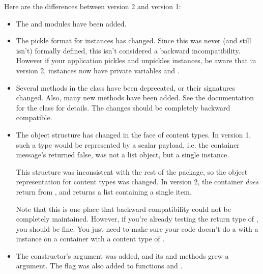 Here are the differences between  version 2 and version 1:

\begin{itemize}
\item The  and  modules
      have been added.

\item The pickle format for  instances has changed.
      Since this was never (and still isn't) formally defined, this
      isn't considered a backward incompatibility.  However if your
      application pickles and unpickles  instances, be
      aware that in  version 2, 
      instances now have private variables  and
      .

\item Several methods in the  class have been
      deprecated, or their signatures changed.  Also, many new methods
      have been added.  See the documentation for the 
      class for details.  The changes should be completely backward
      compatible.

\item The object structure has changed in the face of
       content types.  In 
      version 1, such a type would be represented by a scalar payload,
      i.e. the container message's  returned
      false,  was not a list object, but a single
       instance.

      This structure was inconsistent with the rest of the package, so
      the object representation for  content
      types was changed.  In  version 2, the container
      \emph{does} return  from , and
       returns a list containing a single
       item.

      Note that this is one place that backward compatibility could
      not be completely maintained.  However, if you're already
      testing the return type of , you should be
      fine.  You just need to make sure your code doesn't do a
       with a  instance on a
      container with a content type of .

\item The  constructor's  argument was
      added, and its  and  methods
      grew a  argument.  The  flag was
      also added to functions 
      and .


\end{itemize}
